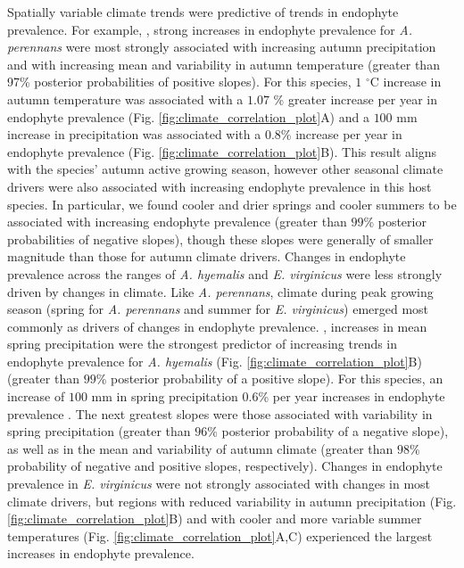 \documentclass[11pt]{article}
\newcommand{\firstrevise}[1]{{\color{black}{#1}}}
\newcommand{\secondrevise}[1]{{\color{black}{#1}}}
\begin{document}
Spatially variable climate trends were predictive of trends in endophyte prevalence.
For example, \secondrevise{among the tested climate drivers}, strong increases in endophyte prevalence for \emph{A. perennans} were most strongly associated with increasing autumn precipitation and with increasing mean and variability in autumn temperature (greater than 97\% posterior probabilities of positive slopes).
For this species, \firstrevise{each} $1$ $^{\circ}$C increase in autumn temperature was associated with a $1.07$ \% greater increase per year in endophyte prevalence (Fig. \ref{fig:climate_correlation_plot}A) and a $100$ mm increase in precipitation was associated with a $0.8$\% \firstrevise{greater} increase per year in endophyte prevalence (Fig. \ref{fig:climate_correlation_plot}B).
This result aligns with the species' autumn active growing season, however other seasonal climate drivers were also \secondrevise{positively} associated with increasing endophyte prevalence in this host species. 
In particular, we found cooler and drier springs and cooler summers to be associated with increasing endophyte prevalence (greater than $99$\% posterior probabilities of negative slopes), though these slopes were generally of smaller magnitude than those for autumn climate drivers. 
Changes in endophyte prevalence across the ranges of \emph{A. hyemalis} and \emph{E. virginicus} were less strongly driven by changes in climate. 
Like \emph{A. perennans}, climate during peak growing season (spring for \emph{A. perennans} and summer for \emph{E. virginicus}) emerged most commonly as drivers of changes in endophyte prevalence.
\secondrevise{Across the tested climate drivers}, increases in mean spring precipitation were the strongest predictor of increasing trends in endophyte prevalence for \emph{A. hyemalis} (Fig. \ref{fig:climate_correlation_plot}B) (greater than $99$\% posterior probability of a positive slope).
For this species, an increase of $100$ mm in spring precipitation \firstrevise{was associated with } $0.6$\% per year \firstrevise{stronger} increases in endophyte prevalence \firstrevise{relative to regions with no change in precipitation}.
The next greatest slopes were those associated with variability in spring precipitation (greater than $96$\% posterior probability of a negative slope), as well as in the mean and variability of autumn climate (greater than $98$\% probability of negative and positive slopes, respectively). 
Changes in endophyte prevalence in \emph{E. virginicus} were not strongly associated with changes in most climate drivers, but regions with reduced variability in autumn precipitation (Fig. \ref{fig:climate_correlation_plot}B) and with cooler and more variable summer temperatures (Fig. \ref{fig:climate_correlation_plot}A,C) experienced the largest increases in endophyte prevalence.
\end{document}
